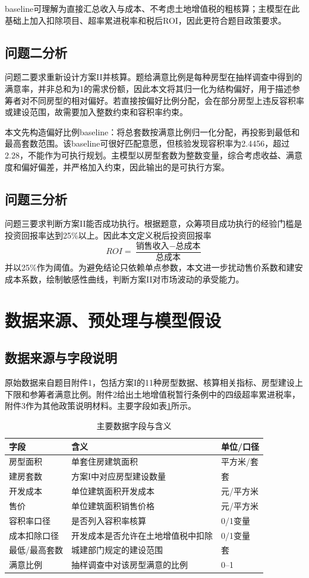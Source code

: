 \documentclass[UTF8,12pt,a4paper]{ctexart}
\begin{document}
baseline可理解为直接汇总收入与成本、不考虑土地增值税的粗核算；主模型在此基础上加入扣除项目、超率累进税率和税后ROI，因此更符合题目政策要求。

\subsection{问题二分析}
问题二要求重新设计方案II并核算。题给满意比例是每种房型在抽样调查中得到的满意率，并非总和为1的需求份额，因此本文将其归一化为结构偏好，用于描述参筹者对不同房型的相对偏好。若直接按偏好比例分配，会在部分房型上违反容积率或建设范围，故需要加入整数约束和容积率约束。

本文先构造偏好比例baseline：将总套数按满意比例归一化分配，再投影到最低和最高套数范围。该baseline可很好匹配意愿，但核验发现容积率为2.4456，超过2.28，不能作为可执行规划。主模型以房型套数为整数变量，综合考虑收益、满意度和偏好偏差，并严格加入约束，因此输出的是可执行方案。

\subsection{问题三分析}
问题三要求判断方案II能否成功执行。根据题意，众筹项目成功执行的经验门槛是投资回报率达到25\%以上。因此本文定义税后投资回报率
\begin{equation}
ROI=\frac{\text{销售收入}-\text{总成本}}{\text{总成本}}
\end{equation}
并以25\%作为阈值。为避免结论只依赖单点参数，本文进一步扰动售价系数和建安成本系数，绘制敏感性曲线，判断方案II对市场波动的承受能力。

\section{数据来源、预处理与模型假设}
\subsection{数据来源与字段说明}
原始数据来自题目附件1，包括方案I的11种房型数据、核算相关指标、房型建设上下限和参筹者满意比例。附件2给出土地增值税暂行条例中的四级超率累进税率，附件3作为其他政策说明材料。主要字段如表\ref{tab:datafields}所示。

\begin{table}[H]\centering\caption{主要数据字段与含义}\label{tab:datafields}
\begin{tabular}{p{3cm}p{8cm}p{3cm}}\toprule
字段 & 含义 & 单位/口径\\\midrule
房型面积 & 单套住房建筑面积 & 平方米/套\\
建房套数 & 方案I中对应房型建设数量 & 套\\
开发成本 & 单位建筑面积开发成本 & 元/平方米\\
售价 & 单位建筑面积销售价格 & 元/平方米\\
容积率口径 & 是否列入容积率核算 & 0/1变量\\
成本扣除口径 & 开发成本是否允许在土地增值税中扣除 & 0/1变量\\
最低/最高套数 & 城建部门规定的建设范围 & 套\\
满意比例 & 抽样调查中对该房型满意的比例 & 0--1\\\bottomrule
\end{tabular}\end{table}
\end{document}
